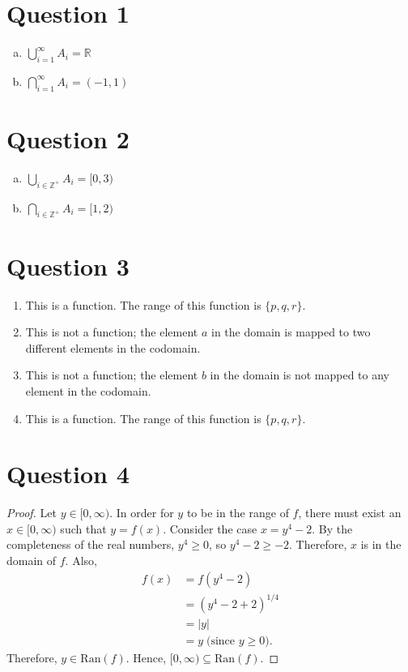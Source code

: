 \documentclass{article}
\begin{document}
\section*{Question 1}
\begin{enumerate}[(a)]
    \item $\bigcup_{i=1}^{\infty} A_i = \mathbb{R}$
    \item $\bigcap_{i=1}^{\infty} A_i = (-1, 1)$
\end{enumerate}

\section*{Question 2}
\begin{enumerate}[(a)]
    \item $\bigcup_{i \in \mathbb{Z}^+} A_i = [0, 3)$
    \item $\bigcap_{i \in \mathbb{Z}^+} A_i = [1, 2)$
\end{enumerate}

\section*{Question 3}
\begin{enumerate}
    \item This is a function. The range of this function is $\{p, q, r\}$.
    \item This is not a function; the element $a$ in the domain is mapped to two different elements in the codomain.
    \item This is not a function; the element $b$ in the domain is not mapped to any element in the codomain.
    \item This is a function. The range of this function is $\{p, q, r\}$.
\end{enumerate}

\section*{Question 4}
\begin{proof}
    Let $y \in [0, \infty)$.
    In order for $y$ to be in the range of $f$, there must exist an $x \in [0, \infty)$ such that $y = f(x)$.
    Consider the case $x = y^4 - 2$.
    By the completeness of the real numbers, $y^4 \geq 0$, so $y^4 - 2 \geq -2$.
    Therefore, $x$ is in the domain of $f$.
    Also,
    \begin{align*}
        f(x) &= f(y^4 - 2) \\
        &= (y^4 - 2 + 2)^{1/4} \\
        &= |y| \\
        &= y \; \text{(since $y \geq 0$)}.
    \end{align*}
    Therefore, $y \in \text{Ran}(f)$. Hence, $[0, \infty) \subseteq \text{Ran}(f)$.
\end{proof}
\end{document}
